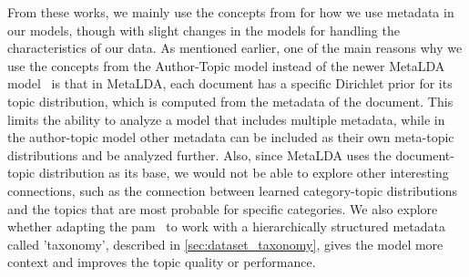 From these works, we mainly use the concepts from \citet{author_topic_2012} for how we use metadata in our models, though with slight changes in the models for handling the characteristics of our data.
As mentioned earlier, one of the main reasons why we use the concepts from the Author-Topic model instead of the newer MetaLDA model~\cite{MetaLDA2017} is that in MetaLDA, each document has a specific Dirichlet prior for its topic distribution, which is computed from the metadata of the document.
This limits the ability to analyze a model that includes multiple metadata, while in the author-topic model other metadata can be included as their own meta-topic distributions and be analyzed further.
Also, since MetaLDA uses the document-topic distribution as its base, we would not be able to explore other interesting connections, such as the connection between learned category-topic distributions and the topics that are most probable for specific categories.
We also explore whether adapting the \gls{pam}~\cite{li2006pachinko} to work with a hierarchically structured metadata called 'taxonomy', described in \autoref{sec:dataset_taxonomy}, gives the model more context and improves the topic quality or performance.

